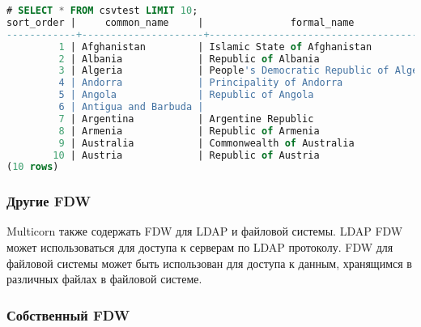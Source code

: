 \begin{lstlisting}[language=SQL,label=lst:pgmulticorn-csv2,caption=Multicorn]
# SELECT * FROM csvtest LIMIT 10;
sort_order |     common_name     |               formal_name               |     main_type     | sub_type | sovereignty |     capital
------------+---------------------+-----------------------------------------+-------------------+----------+-------------+------------------
         1 | Afghanistan         | Islamic State of Afghanistan            | Independent State |          |             | Kabul
         2 | Albania             | Republic of Albania                     | Independent State |          |             | Tirana
         3 | Algeria             | People's Democratic Republic of Algeria | Independent State |          |             | Algiers
         4 | Andorra             | Principality of Andorra                 | Independent State |          |             | Andorra la Vella
         5 | Angola              | Republic of Angola                      | Independent State |          |             | Luanda
         6 | Antigua and Barbuda |                                         | Independent State |          |             | Saint John's
         7 | Argentina           | Argentine Republic                      | Independent State |          |             | Buenos Aires
         8 | Armenia             | Republic of Armenia                     | Independent State |          |             | Yerevan
         9 | Australia           | Commonwealth of Australia               | Independent State |          |             | Canberra
        10 | Austria             | Republic of Austria                     | Independent State |          |             | Vienna
(10 rows)
\end{lstlisting}


\subsubsection{Другие FDW}

Multicorn также содержать FDW для LDAP и файловой системы. LDAP FDW может использоваться для доступа к серверам по LDAP протоколу. FDW для файловой системы может быть использован для доступа к данным, хранящимся в различных файлах в файловой системе.

\subsubsection{Собственный FDW}

